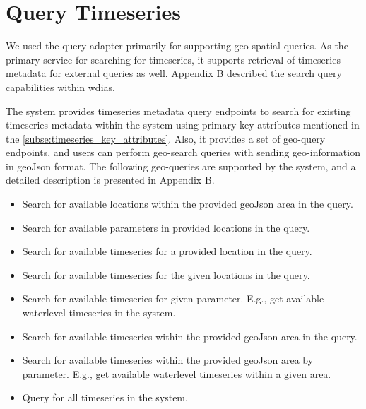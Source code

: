 \section{Query Timeseries}
\label{se:query}

We used the query adapter primarily for supporting geo-spatial queries. As the primary service for searching for timeseries, it supports retrieval of timeseries metadata for external queries as well. Appendix B described the search query capabilities within \acrshort{wdias}.

The system provides timeseries metadata query endpoints to search for existing timeseries metadata within the system using primary key attributes mentioned in the \cref{subse:timeseries_key_attributes}.
Also, it provides a set of geo-query endpoints, and users can perform geo-search queries with sending geo-information in geoJson format. The following geo-queries are supported by the system, and a detailed description is presented in Appendix B.
\begin{itemize}
    \item Search for available locations within the provided geoJson area in the query.
    \item Search for available parameters in provided locations in the query.
    \item Search for available timeseries for a provided location in the query.
    \item Search for available timeseries for the given locations in the query.
    \item Search for available timeseries for given parameter. E.g., get available waterlevel timeseries in the system.
    \item Search for available timeseries within the provided geoJson area in the query.
    \item Search for available timeseries within the provided geoJson area by parameter. E.g., get available waterlevel timeseries within a given area.
    \item Query for all timeseries in the system.
\end{itemize}
